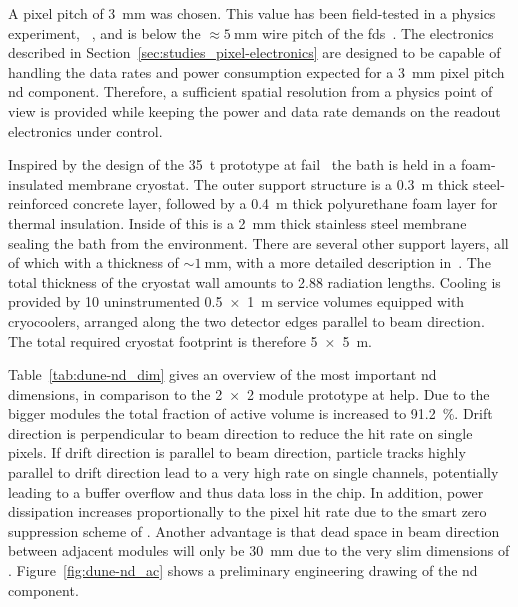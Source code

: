 A pixel pitch of \SI{3}{\milli\metre} was chosen.
This value has been field-tested in a physics experiment, \uboone{}~\cite{uboone}, and is below the $\approx \SI{5}{\milli\metre}$ wire pitch of the \dune{} \glspl{fd}~\cite{dune4}.
The \larpix{} electronics described in Section~\ref{sec:studies_pixel-electronics} are designed to be capable of handling the data rates and power consumption expected for a \SI{3}{\milli\metre} pixel pitch \AC{} \gls{nd} component.
Therefore, a sufficient spatial resolution from a physics point of view is provided while keeping the power and data rate demands on the readout electronics under control.

Inspired by the design of the \dune{} \SI{35}{\tonne} prototype at \gls{fail}~\cite{dune4} the \lar{} bath is held in a foam-insulated membrane cryostat.
The outer support structure is a \SI{0.3}{\metre} thick steel-reinforced concrete layer, followed by a \SI{0.4}{\metre} thick polyurethane foam layer for thermal insulation.
Inside of this is a \SI{2}{\milli\metre} thick stainless steel membrane sealing the \lar{} bath from the environment.
There are several other support layers, all of which with a thickness of $\sim{\SI{1}{\milli\metre}}$, with a more detailed description in~\cite{dune4}.
The total thickness of the cryostat wall amounts to \num{2.88} radiation lengths.
Cooling is provided by \num{10} uninstrumented \SI{0.5 x 1}{\metre} service volumes equipped with cryocoolers, arranged along the two detector edges parallel to beam direction.
The total required cryostat footprint is therefore \SI{5 x 5}{\metre}.

Table~\ref{tab:dune-nd_dim} gives an overview of the most important \AC{} \gls{nd} dimensions, in comparison to the \num{2 x 2} module prototype at \gls{help}.
Due to the bigger modules the total fraction of active volume is increased to \SI{91.2}{\percent}.
Drift direction is perpendicular to beam direction to reduce the hit rate on single pixels.
If drift direction is parallel to beam direction, particle tracks highly parallel to drift direction lead to a very high rate on single channels, potentially leading to a buffer overflow and thus data loss in the \larpix{} chip.
In addition, power dissipation increases proportionally to the pixel hit rate due to the smart zero suppression scheme of \larpix{}.
Another advantage is that dead space in beam direction between adjacent modules will only be \SI{30}{\milli\metre} due to the very slim dimensions of \AL{}.
Figure~\ref{fig:dune-nd_ac} shows a preliminary engineering drawing of the \AC{} \gls{nd} component.